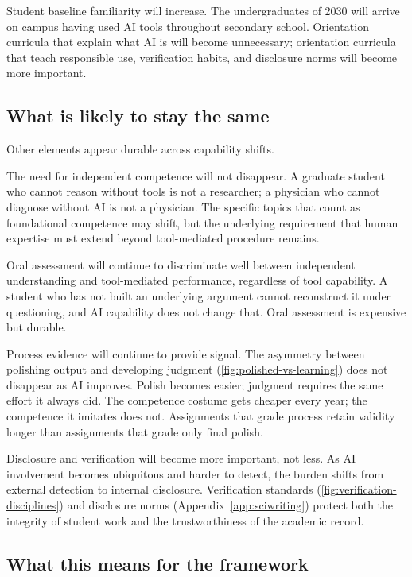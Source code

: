 \documentclass{SIAMbook2023}
\begin{document}
Student baseline familiarity will increase. The undergraduates of 2030 will arrive on campus having used AI tools throughout secondary school. Orientation curricula that explain what AI is will become unnecessary; orientation curricula that teach responsible use, verification habits, and disclosure norms will become more important.

\subsection{What is likely to stay the same}
\label{u:subsec:will-stay}

Other elements appear durable across capability shifts.

The need for independent competence will not disappear. A graduate student who cannot reason without tools is not a researcher; a physician who cannot diagnose without AI is not a physician. The specific topics that count as foundational competence may shift, but the underlying requirement that human expertise must extend beyond tool-mediated procedure remains.

Oral assessment will continue to discriminate well between independent understanding and tool-mediated performance, regardless of tool capability. A student who has not built an underlying argument cannot reconstruct it under questioning, and AI capability does not change that. Oral assessment is expensive but durable.

Process evidence will continue to provide signal. The asymmetry between polishing output and developing judgment (\cref{fig:polished-vs-learning}) does not disappear as AI improves. Polish becomes easier; judgment requires the same effort it always did. The competence costume gets cheaper every year; the competence it imitates does not. Assignments that grade process retain validity longer than assignments that grade only final polish.

Disclosure and verification will become more important, not less. As AI involvement becomes ubiquitous and harder to detect, the burden shifts from external detection to internal disclosure. Verification standards (\cref{fig:verification-disciplines}) and disclosure norms (Appendix~\ref{app:sciwriting}) protect both the integrity of student work and the trustworthiness of the academic record.

\subsection{What this means for the framework}
\label{u:subsec:framework-stability}
\end{document}
